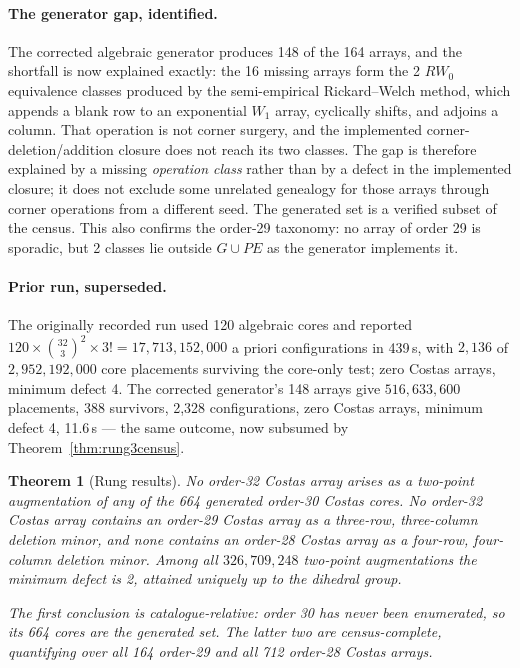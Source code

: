 \documentclass[11pt,a4paper]{article}
\newtheorem{theorem}{Theorem}[section]
\theoremstyle{definition}
\begin{document}
\paragraph{The generator gap, identified.}
The corrected algebraic generator produces 148 of the 164 arrays, and the
shortfall is now explained exactly: the 16 missing arrays form the 2 $RW_0$
equivalence classes produced by the semi-empirical Rickard--Welch method, which
appends a blank row to an exponential $W_1$ array, cyclically shifts, and adjoins
a column. That operation is not corner surgery, and the implemented
corner-deletion/addition closure does not reach its two classes. The gap is
therefore explained by a missing \emph{operation class} rather than by a defect
in the implemented closure; it does not exclude some unrelated genealogy for
those arrays through corner operations from a different seed. The generated set is a verified subset of the
census. This also confirms the order-29 taxonomy: no array of order 29 is
sporadic, but 2 classes lie outside $G\cup PE$ as the generator implements it.

\paragraph{Prior run, superseded.}
The originally recorded run used 120 algebraic cores and reported
$120\times\binom{32}{3}^2\times3!=17{,}713{,}152{,}000$ a priori configurations
in 439\,s, with $2{,}136$ of $2{,}952{,}192{,}000$ core placements surviving the
core-only test; zero Costas arrays, minimum defect 4. The corrected generator's
148 arrays give
$516{,}633{,}600$ placements, 388 survivors, 2{,}328 configurations, zero Costas
arrays, minimum defect 4, 11.6\,s --- the same outcome, now subsumed by
Theorem~\ref{thm:rung3census}.

\begin{theorem}[Rung results]
\label{thm:rungs}
No order-32 Costas array arises as a two-point augmentation of any of the 664
generated order-30 Costas cores. No order-32 Costas array contains an order-29
Costas array as a three-row, three-column deletion minor, and none contains an
order-28 Costas array as a four-row, four-column deletion minor. Among all
$326{,}709{,}248$ two-point augmentations the minimum defect is 2, attained
uniquely up to the dihedral group.

The first conclusion is catalogue-relative: order 30 has never been enumerated,
so its 664 cores are the generated set. The latter two are census-complete,
quantifying over all 164 order-29 and all 712 order-28 Costas arrays.
\end{theorem}
\end{document}
